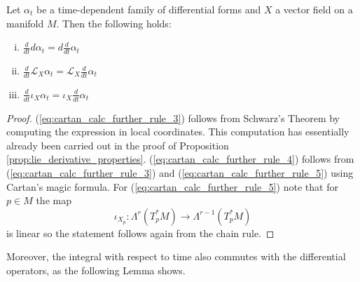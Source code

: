 \begin{lemma}
    \label{lem:cartan_calculus_time_derivative_commutes_with_diff_ops}
    Let $\alpha_t$ be a time-dependent family of differential forms and $X$ a vector field on a manifold $M$. Then the following holds:
    \begin{enumerate}[(i)]
        \item $\frac{d}{dt}d\alpha_t = d\frac{d}{dt}\alpha_t$ \label{eq:cartan_calc_further_rule_3}
        \item $\frac{d}{dt} \mathcal{L}_X \alpha_t = \mathcal{L}_X \frac{d}{dt}\alpha_t$ \label{eq:cartan_calc_further_rule_4}
        \item $\frac{d}{dt} \iota_X \alpha_t = \iota_X \frac{d}{dt}\alpha_t$ \label{eq:cartan_calc_further_rule_5}
    \end{enumerate}
\end{lemma}
\begin{proof}
    (\ref{eq:cartan_calc_further_rule_3}) follows from Schwarz's Theorem by computing the expression in local coordinates. This computation has essentially already been carried out in the proof of Proposition \ref{prop:lie_derivative_properties}. (\ref{eq:cartan_calc_further_rule_4}) follows from (\ref{eq:cartan_calc_further_rule_3}) and (\ref{eq:cartan_calc_further_rule_5}) using Cartan's magic formula. For (\ref{eq:cartan_calc_further_rule_5}) note that for $p \in M$ the map 
    \[
    \iota_{X_p} \colon \Lambda^r(T_{p}^\ast M) \to \Lambda^{r-1}(T_{p}^\ast M)
    \]
    is linear so the statement follows again from the chain rule.
\end{proof}

Moreover, the integral with respect to time also commutes with the differential operators, as the following Lemma shows.

